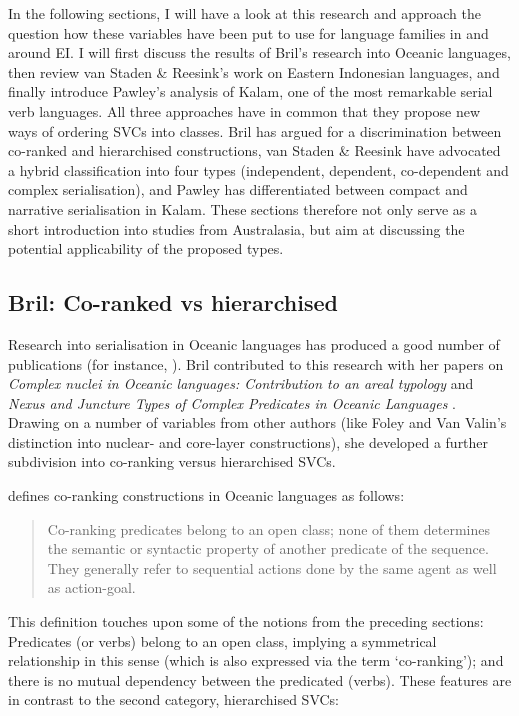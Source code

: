 In the following sections, I will have a look at this research and approach the question how these variables have been put to use for language families in and around EI. I will first discuss the results of Bril's research into Oceanic languages, then review van Staden \& Reesink's work on Eastern Indonesian languages, and finally introduce Pawley's analysis of Kalam, one of the most remarkable serial verb languages. All three approaches have in common that they propose new ways of ordering SVCs into classes. Bril has argued for a discrimination between co-ranked and hierarchised constructions, van Staden \& Reesink have advocated a hybrid classification into four types (independent, dependent, co-dependent and complex serialisation), and Pawley has differentiated between compact and narrative serialisation in Kalam. These sections therefore not only serve as a short introduction into studies from Australasia, but aim at discussing the potential applicability of the proposed types.

\subsection{Bril: Co-ranked vs hierarchised}

Research into serialisation in Oceanic languages has produced a good number of publications (for instance, \citealt{durie1988verb, bradshaw1993subject, crowley1987serial, crowley2002serial}). Bril contributed to this research with her papers on \textit{Complex nuclei in Oceanic languages: Contribution to an areal typology}  \citep{bril2004complex} and \textit{Nexus and Juncture Types of Complex Predicates in Oceanic Languages} \citep{bril2007nexus}. Drawing on a number of variables from other authors (like Foley and Van Valin's distinction into nuclear- and core-layer constructions), she developed a further subdivision into co-ranking versus hierarchised SVCs. 

\citet[269]{bril2007nexus} defines co-ranking constructions in Oceanic languages as follows:

\begin{quote}Co-ranking predicates belong to an open class; none of them determines the semantic or syntactic property of another predicate of the sequence. They generally refer to sequential actions done by the same agent as well as action-goal. \end{quote}

This definition touches upon some of the notions from the preceding sections: Predicates (or verbs) belong to an open class, implying a symmetrical relationship in this sense (which is also expressed via the term `co-ranking'); and there is no mutual dependency between the predicated (verbs). These features are in contrast to the second category, hierarchised SVCs:

